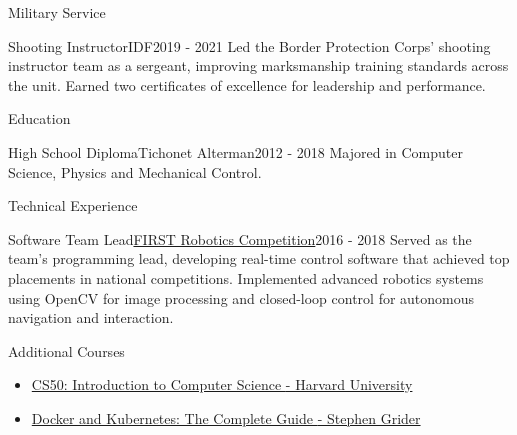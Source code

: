 \documentclass[]{mcdowellcv}
\begin{document}
	\begin{cvsection}{Military Service}
		\begin{cvsubsection}{Shooting Instructor}{IDF}{2019 - 2021}
			Led the Border Protection Corps’ shooting instructor team as a sergeant, improving marksmanship training standards across the unit. Earned two certificates of excellence for leadership and performance.
		\end{cvsubsection}
	\end{cvsection}
	
	\begin{cvsection}{Education}
		\begin{cvsubsection}{High School Diploma}{Tichonet Alterman}{2012 - 2018}
			Majored in Computer Science, Physics and Mechanical Control.
		\end{cvsubsection}
	\end{cvsection}
	
	\begin{cvsection}{Technical Experience}
		\begin{cvsubsection}{Software Team Lead}{\href{https://www.firstinspires.org/robotics/frc/what-is-first-robotics-competition}{FIRST Robotics Competition}}{2016 - 2018}	
			Served as the team’s programming lead, developing real-time control software that achieved top placements in national competitions. Implemented advanced robotics systems using OpenCV for image processing and \linebreak closed-loop control for autonomous navigation and interaction.
		\end{cvsubsection}
	\end{cvsection}

	\begin{cvsection}{Additional Courses}
		\begin{cvsubsection}{}{}{}	
			\begin{itemize}
				\item \href{https://www.edx.org/cs50}{CS50: Introduction to Computer Science \tiny{ - Harvard University}}
				\item \href{https://www.udemy.com/course/docker-and-kubernetes-the-complete-guide/}{Docker and Kubernetes: The Complete Guide \tiny{ - Stephen Grider}}
			\end{itemize}
		\end{cvsubsection}
	\end{cvsection}
	
\end{document}
